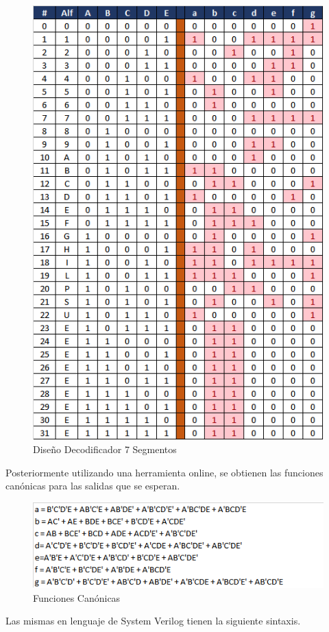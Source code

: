 \documentclass[journal]{IEEEtran}
\begin{document}
	\begin{figure}[htb]
		\centering
		\includegraphics[scale = 0.5]{img/p1/alf_dis.png}
		\caption{Diseño Decodificador 7 Segmentos}
		\label{fig:disAlf}
	\end{figure}
	
	Posteriormente utilizando una herramienta online, se obtienen las funciones canónicas para las salidas que se esperan.
	
	\begin{figure}[htb]
		\centering
		\includegraphics[scale = 0.8]{img/p1/funC1.png}
		\caption{Funciones Canónicas}
		\label{fig:funC}
	\end{figure}
	Las mismas en lenguaje de System Verilog tienen la siguiente sintaxis. 
	
\end{document}
